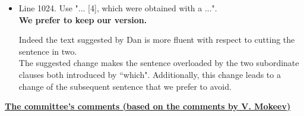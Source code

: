\documentclass[superscriptaddress,showpacs,amssymb,amsmath,amsfonts,linenumbers,article]{revtex4-1}
\begin{document}
\begin{itemize}
\begin{itemize}
\item Line 1024. Use "... [4], which were obtained with a ...".\\
{\bf We prefer to keep our version.}

\vspace{1em}

{\color{red} Indeed the text suggested by Dan is more fluent with respect to cutting the sentence in two.}\\
{\color{blue} The suggested change makes the sentence overloaded by the two subordinate clauses both introduced by ``which". Additionally, this change leads to a change of the subsequent sentence that we prefer to avoid.} 


\end{itemize}  


  
\end{itemize}


{\bf \Large \underline{The committee's comments (based on the comments by V. Mokeev)}}\\[0.5cm]
\end{document}
